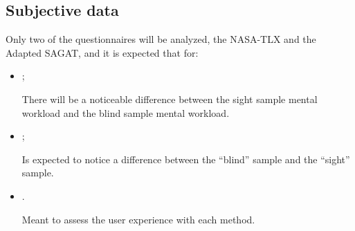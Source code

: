 \subsection{Subjective data}

Only two of the questionnaires will be analyzed, the NASA-TLX and the Adapted SAGAT, and it is expected that for:

\begin{itemize}
    \item {};
    
        There will be a noticeable difference between the sight sample mental workload and the blind sample mental workload.

    \item {};
    
        Is expected to notice a difference between the “blind” sample and the “sight” sample.

    \item {}.

        Meant to assess the user experience with each method.

\end{itemize}





